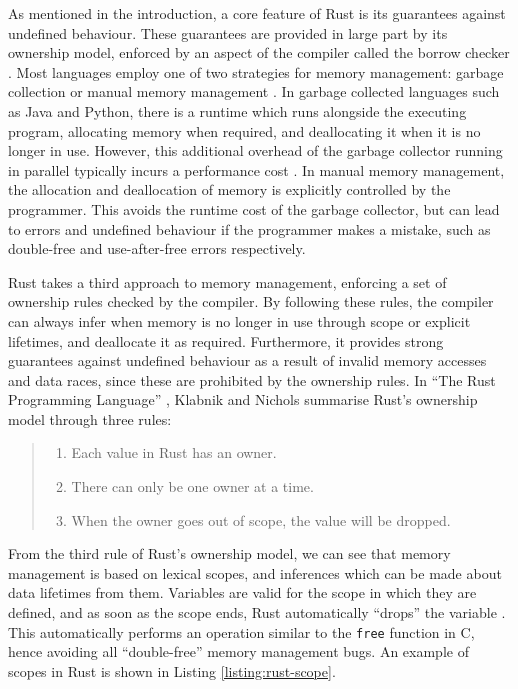 As mentioned in the introduction, a core feature of Rust is its guarantees against undefined behaviour. These guarantees are provided in large part by its ownership model, enforced by an aspect of the compiler called the borrow checker \cite{ReferencesBorrowing}. Most languages employ one of two strategies for memory management: garbage collection or manual memory management \cite{hertzQuantifyingPerformanceGarbage2005}. In garbage collected languages such as Java and Python, there is a runtime which runs alongside the executing program, allocating memory when required, and deallocating it when it is no longer in use. However, this additional overhead of the garbage collector running in parallel typically incurs a performance cost  \cite{hertzQuantifyingPerformanceGarbage2005}. In manual memory management, the allocation and deallocation of memory is explicitly controlled by the programmer. This avoids the runtime cost of the garbage collector, but can lead to errors and undefined behaviour if the programmer makes a mistake, such as double-free and use-after-free errors respectively.

Rust takes a third approach to memory management, enforcing a set of ownership rules checked by the compiler. By following these rules, the compiler can always infer when memory is no longer in use through scope or explicit lifetimes, and deallocate it as required. Furthermore, it provides strong guarantees against undefined behaviour as a result of invalid memory accesses and data races, since these are prohibited by the ownership rules. In ``The Rust Programming Language'' \cite{RustProgrammingLanguage}, Klabnik and Nichols summarise Rust's ownership model through three rules:

\begin{quote}
    \begin{enumerate}
        \item Each value in Rust has an owner.
        \item There can only be one owner at a time.
        \item When the owner goes out of scope, the value will be dropped.
    \end{enumerate}
\end{quote}

From the third rule of Rust's ownership model, we can see that memory management is based on lexical scopes, and inferences which can be made about data lifetimes from them. Variables are valid for the scope in which they are defined, and as soon as the scope ends, Rust automatically ``drops'' the variable \cite{sautterOBSERVINGPARALLELEXECUTION}. This automatically performs an operation similar to the \texttt{free} function in C, hence avoiding all ``double-free'' memory management bugs. An example of scopes in Rust is shown in Listing \ref{listing:rust-scope}.

